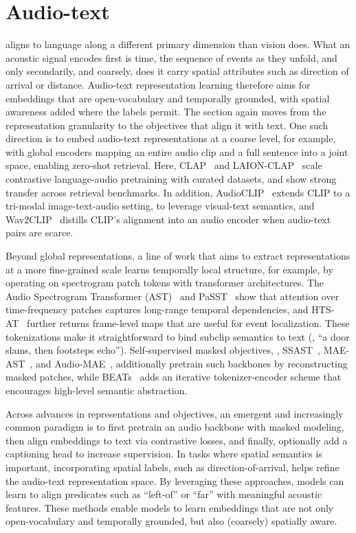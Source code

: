 \section{Audio-text}
\label{cross_modality_audio_text}
 aligns to language along a different primary dimension than vision does. What an acoustic signal encodes first is time, the sequence of events as they unfold, and only secondarily, and coarsely, does it carry spatial attributes such as direction of arrival or distance. 
Audio-text representation learning therefore aims for embeddings that are open-vocabulary and temporally grounded, with spatial awareness added where the labels permit. 
The section again moves from the representation granularity to the objectives that align it with text. 
One such direction is to embed audio-text representations at a coarse level, for example, with global encoders mapping an entire audio clip and a full sentence into a joint space, enabling zero-shot retrieval. 
Here, CLAP~\cite{elizalde2023clap} and LAION-CLAP~\cite{wu2023large} scale contrastive language-audio pretraining with curated datasets, and show strong transfer across retrieval benchmarks. 
In addition, AudioCLIP~\cite{guzhov2022audioclip} extends CLIP to a tri-modal image-text-audio setting, to leverage visual-text semantics, and Wav2CLIP~\cite{wu2022wav2clip} distills CLIP's alignment into an audio encoder when audio-text pairs are scarce.

Beyond global representations, a line of work that aims to extract representations at a more fine-grained scale learns temporally local structure, for example, by operating on spectrogram patch tokens with transformer architectures. 
The Audio Spectrogram Transformer (AST)~\cite{gong2021ast} and PaSST~\cite{koutini2021efficient} show that attention over time-frequency patches captures long-range temporal dependencies, and HTS-AT~\cite{chen2022hts} further returns frame-level maps that are useful for event localization. 
These tokenizations make it straightforward to bind subclip semantics to text (\eg, ``a door slams, then footsteps echo''). 
Self-supervised masked objectives, \eg, SSAST~\cite{gong2022ssast}, MAE-AST~\cite{baade2022mae}, and Audio-MAE~\cite{huang2022masked}, additionally pretrain such backbones by reconstructing masked patches, while BEATs~\cite{chen2022beats} adds an iterative tokenizer-encoder scheme that encourages high-level semantic abstraction.

Across advances in representations and objectives, an emergent and increasingly common paradigm is to first pretrain an audio backbone with masked modeling, then align embeddings to text via contrastive losses, and finally, optionally add a captioning head to increase supervision. 
In tasks where spatial semantics is important, incorporating spatial labels, such as direction-of-arrival, helps refine the audio-text representation space. 
By leveraging these approaches, models can learn to align predicates such as ``left-of'' or ``far'' with meaningful acoustic features. 
These methods enable models to learn embeddings that are not only open-vocabulary and temporally grounded, but also (coarsely) spatially aware.

